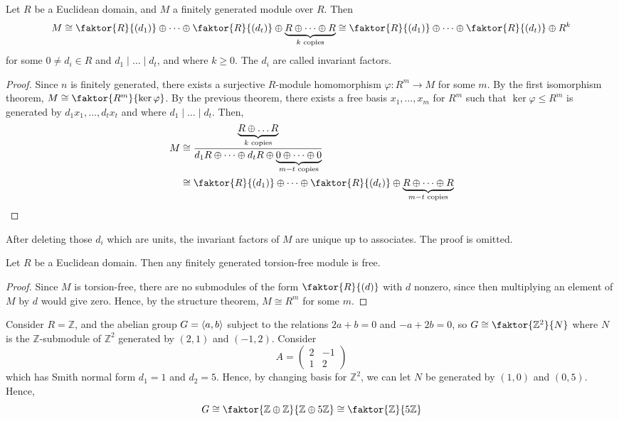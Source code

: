\begin{theorem}
	Let \( R \) be a Euclidean domain, and \( M \) a finitely generated module over \( R \).
	Then
	\[ M \cong \faktor{R}{(d_1)} \oplus \dots \oplus \faktor{R}{(d_t)} \oplus \underbrace{R \oplus \dots \oplus R}_{k \text{ copies}} \cong \faktor{R}{(d_1)} \oplus \dots \oplus \faktor{R}{(d_t)} \oplus R^k \]
	for some \( 0 \neq d_i \in R \) and \( d_1 \mid \dots \mid d_t \), and where \( k \geq 0 \).
	The \( d_i \) are called invariant factors.
\end{theorem}
\begin{proof}
	Since \( n \) is finitely generated, there exists a surjective \( R \)-module homomorphism \( \varphi \colon R^m \to M \) for some \( m \).
	By the first isomorphism theorem, \( M \cong \faktor{R^m}{\ker \varphi} \).
	By the previous theorem, there exists a free basis \( x_1, \dots, x_m \) for \( R^m \) such that \( \ker \varphi \leq R^m \) is generated by \( d_1 x_1, \dots, d_t x_t \) and where \( d_1 \mid \dots \mid d_t \).
	Then,
	\begin{align*}
		M &\cong \frac{\underbrace{R \oplus \dots R}_{k \text{ copies}}}{d_1 R \oplus \dots \oplus d_t R \oplus \underbrace{0 \oplus \dots \oplus 0}_{m-t \text{ copies}}} \\
		&\cong \faktor{R}{(d_1)} \oplus \dots \oplus \faktor{R}{(d_t)} \oplus \underbrace{R \oplus \dots \oplus R}_{m-t \text{ copies}}
	\end{align*}
\end{proof}
\begin{remark}
	After deleting those \( d_i \) which are units, the invariant factors of \( M \) are unique up to associates.
	The proof is omitted.
\end{remark}
\begin{corollary}
	Let \( R \) be a Euclidean domain.
	Then any finitely generated torsion-free module is free.
\end{corollary}
\begin{proof}
	Since \( M \) is torsion-free, there are no submodules of the form \( \faktor{R}{(d)} \) with \( d \) nonzero, since then multiplying an element of \( M \) by \( d \) would give zero.
	Hence, by the structure theorem, \( M \cong R^m \) for some \( m \).
\end{proof}
\begin{example}
	Consider \( R = \mathbb Z \), and the abelian group \( G = \langle{} a,b \rangle \) subject to the relations \( 2a + b = 0 \) and \( -a + 2b = 0 \), so \( G \cong \faktor{\mathbb Z^2}{N} \) where \( N \) is the \( \mathbb Z \)-submodule of \( \mathbb Z^2 \) generated by \( (2,1) \) and \( (-1,2) \).
	Consider
	\[ A = \begin{pmatrix}
		2 & -1 \\
		1 & 2
	\end{pmatrix} \]
	which has Smith normal form \( d_1 = 1 \) and \( d_2 = 5 \).
	Hence, by changing basis for \( \mathbb Z^2 \), we can let \( N \) be generated by \( (1,0) \) and \( (0,5) \).
	Hence,
	\[ G \cong \faktor{\mathbb Z \oplus \mathbb Z}{\mathbb Z \oplus 5 \mathbb Z} \cong \faktor{\mathbb Z}{5\mathbb Z} \]
\end{example}
